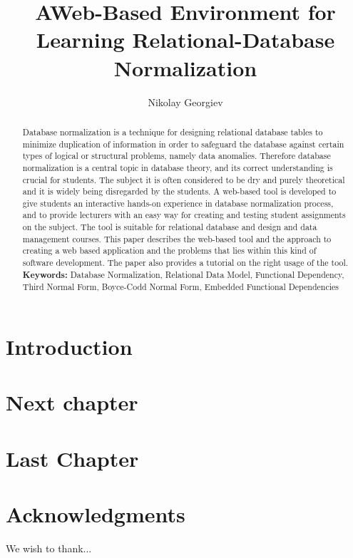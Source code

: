 \documentclass[a4paper,11pt,twoside]{report}
\title{AWeb-Based Environment for Learning
Relational-Database Normalization }
\author{Nikolay Georgiev}
\begin{document}

\maketitle

\begin{abstract}

Database normalization is a technique for designing relational database tables 
to minimize duplication of information in order to safeguard the database 
against certain types of logical or structural problems, namely data anomalies. 
Therefore database normalization is a central topic in database theory, and its 
correct understanding is crucial for students. The subject it is often 
considered to be dry and purely theoretical and it is widely being disregarded 
by the students. A web-based tool is developed to give students an interactive 
hands-on experience in database normalization process, and to provide lecturers 
with an easy way for creating and testing student assignments on the subject.  
The tool is suitable for relational database and design and data management 
courses. This paper describes the web-based tool and the approach to creating a 
web based application and the problems that lies within this kind of software 
development. The paper also provides a tutorial on the right usage of the tool.   
\newline
\newline
\textbf{Keywords:} Database Normalization, Relational Data Model, Functional Dependency, 
Third Normal Form, Boyce-Codd Normal Form, Embedded Functional Dependencies

\end{abstract}

\cleardoublepage

\tableofcontents
 
\cleardoublepage

\listoffigures
 
\cleardoublepage
{}
\setcounter{page}{1}
 
\chapter{Introduction}

\chapter{Next chapter}

\chapter{Last Chapter}
 
\cleardoublepage
{}
\chapter*{Acknowledgments}

We wish to thank...

\cleardoublepage
{}


 
\end{document}
